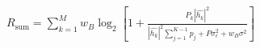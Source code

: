 \documentclass[preview]{standalone}
\begin{document}
\begin{align*}
R_{\mathrm{sum}} = \sum_{k=1}^{M} w_B \log_2 \left[1 + \frac{P_k \left|\hat{h_k}\right|^2}{\left|\hat{h_k}\right|^2 \sum_{j=1}^{K-1} {p_j} + P \sigma_{\epsilon}^2 + w_B \sigma^2}\right]
\end{align*}
\end{document}
